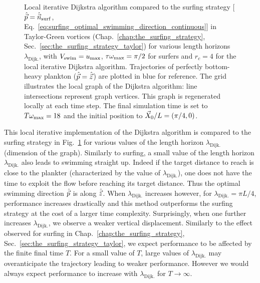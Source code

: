 \begin{figure}%
	\centering
	
	\caption[Local iterative Dijkstra algorithm compared to the surfing strategy in Taylor-Green vortices.]{
		Local iterative Dijkstra algorithm compared to the surfing strategy [$\hat{\vec{p}} = \hat{\vec{n}}_{\mathrm{surf}}$, Eq.~\eqref{eq:surfing_optimal_swimming_direction_continuous}] in Taylor-Green vortices (Chap.~\ref{chap:the_surfing_strategy}, Sec.~\ref{sec:the_surfing_strategy_taylor}) for various length horizons $\lambda_{\mathrm{Dijk.}}$, with $V_{\mathrm{swim}} = u_{\max}$, $\tau \omega_{\max} = \pi/2$ for surfers and $r_c = 4$ for the local iterative Dijkstra algorithm.
		Trajectories of perfectly bottom-heavy plankton ($\hat{\vec{p}} = \hat{\vec{z}}$) are plotted in blue for reference.
		The grid illustrates the local graph of the Dijkstra algorithm: line intersections represent graph vertices.
		This graph is regenerated locally at each time step.
		The final simulation time is set to $T \omega_{\max} = 18$ and the initial position to $\vec{X}_0/L = (\pi/4, 0)$.
	}
	\label{fig:taylor_green_vortex_iterative_local_dijkstra}
\end{figure}
This local iterative implementation of the Dijkstra algorithm is compared to the surfing strategy in Fig.~\ref{fig:taylor_green_vortex_iterative_local_dijkstra} for various values of the length horizon $\lambda_{\mathrm{Dijk.}}$ (dimension of the graph).
Similarly to surfing, a small value of the length horizon $\lambda_{\mathrm{Dijk.}}$ also leads to swimming straight up.
Indeed if the target distance to reach is close to the plankter (characterized by the value of $\lambda_{\mathrm{Dijk.}}$), one does not have the time to exploit the flow before reaching its target distance. 
Thus the optimal swimming direction $\hat{\vec{p}}$ is along $\hat{\vec{z}}$.
When $\lambda_{\mathrm{Dijk.}}$ increases however, for $\lambda_{\mathrm{Dijk.}} = \pi L / 4$, performance increases drastically and this method outperforms the surfing strategy at the cost of a larger time complexity.
Surprisingly, when one further increases $\lambda_{\mathrm{Dijk.}}$, we observe a weaker vertical displacement.
Similarly to the effect observed for surfing in Chap.~\ref{chap:the_surfing_strategy}, Sec.~\ref{sec:the_surfing_strategy_taylor}, we expect performance to be affected by the finite final time $T$.
For a small value of $T$, large values of $\lambda_{\mathrm{Dijk.}}$ may overanticipate the trajectory leading to weaker performance.
However we would always expect performance to increase with $\lambda_{\mathrm{Dijk.}}$ for $T \to \infty$.

